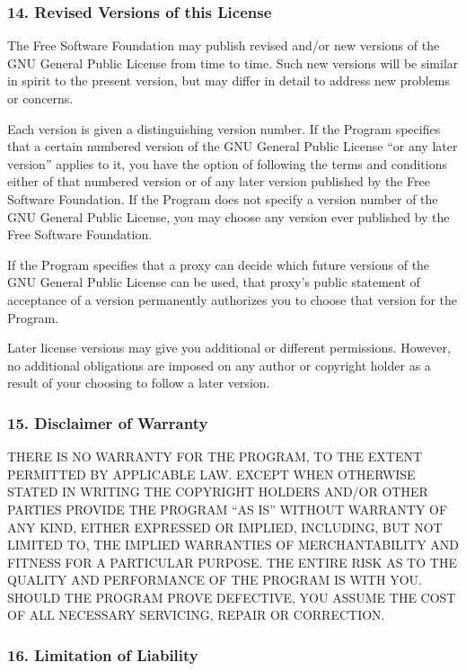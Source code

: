 \documentclass[a4paper, 11pt, twoside]{article}
\begin{document}
\subsubsection{14. Revised Versions of this License}

The Free Software Foundation may publish revised and/or new versions of the GNU General Public License from time to time. Such new versions will be similar in spirit to the present version, but may differ in detail to address new problems or concerns.

Each version is given a distinguishing version number. If the Program specifies that a certain numbered version of the GNU General Public License “or any later version” applies to it, you have the option of following the terms and conditions either of that numbered version or of any later version published by the Free Software Foundation. If the Program does not specify a version number of the GNU General Public License, you may choose any version ever published by the Free Software Foundation.

If the Program specifies that a proxy can decide which future versions of the GNU General Public License can be used, that proxy's public statement of acceptance of a version permanently authorizes you to choose that version for the Program.

Later license versions may give you additional or different permissions. However, no additional obligations are imposed on any author or copyright holder as a result of your choosing to follow a later version.

\subsubsection{15. Disclaimer of Warranty}

THERE IS NO WARRANTY FOR THE PROGRAM, TO THE EXTENT PERMITTED BY APPLICABLE LAW. EXCEPT WHEN OTHERWISE STATED IN WRITING THE COPYRIGHT HOLDERS AND/OR OTHER PARTIES PROVIDE THE PROGRAM “AS IS” WITHOUT WARRANTY OF ANY KIND, EITHER EXPRESSED OR IMPLIED, INCLUDING, BUT NOT LIMITED TO, THE IMPLIED WARRANTIES OF MERCHANTABILITY AND FITNESS FOR A PARTICULAR PURPOSE. THE ENTIRE RISK AS TO THE QUALITY AND PERFORMANCE OF THE PROGRAM IS WITH YOU. SHOULD THE PROGRAM PROVE DEFECTIVE, YOU ASSUME THE COST OF ALL NECESSARY SERVICING, REPAIR OR CORRECTION.

\subsubsection{16. Limitation of Liability}
\end{document}
